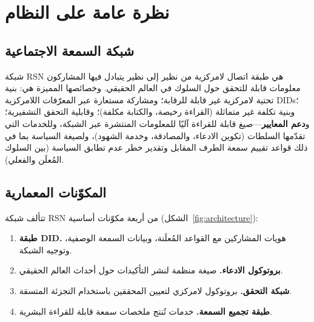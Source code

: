 \documentclass[11pt,a4paper,twocolumn]{article}
\begin{document}
\section{نظرة عامة على النظام}

\subsection{شبكة السمعة الاجتماعية}

شبكة RSN هي طبقة اتصال لامركزية من نظير إلى نظير يتبادل فيها المشاركون معلومات قابلة للتحقق حول السلوك في العالم الحقيقي. وخصائصها المميزة هي: بنية تحتية لامركزية غير قابلة للرقابة؛ ومشاركة مستعارة عبر المعرّفات اللامركزية DIDs؛ وبنية تكلفة غير متماثلة (القراءة رخيصة، والكتابة مكلفة)؛ وقابلية التحقق التشفيرية؛ و\textbf{دعم المعايير}---صيغ قابلة للقراءة آليًا للمعلومات المنتشرة عبر الشبكة، وللخدمات التي تقدّمها السلطات (تكوين الادعاء، والمصادقة، وخدمة الشهود)، ولصيغة السياسة بما في ذلك قواعد تقييم سمعة الطرف المقابل وتقدير خطر عدم تطابق السياسة (بين السلوك المُعلَن والفعلي).

\subsection{المكوّنات المعمارية}

تتألف شبكة RSN من أربعة مكوّنات أساسية (الشكل~\ref{fig:architecture}):
\begin{enumerate}[nosep]
\item \textbf{طبقة DID.} هويات المشاركين مع القواعد المُعلَنة، وبيانات السمعة الوصفية، وتوجيه الشبكة.
\item \textbf{بروتوكول الادعاء.} صيغة منظمة لنشر التأكيدات حول أحداث العالم الحقيقي.
\item \textbf{شبكة التحقق.} بروتوكول لامركزي لتعيين المحققين باستخدام التجزئة المتسقة.
\item \textbf{طبقة تجميع السمعة.} خدمات تُنتج ملخصات سمعة قابلة للقراءة البشرية.
\end{enumerate}
\end{document}
